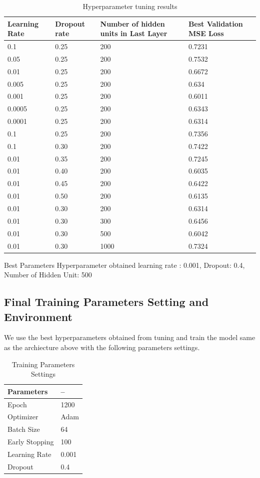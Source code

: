 \documentclass{article}
\begin{document}
\pagebreak

\begin{table}[htb]
	\caption{Hyperparameter tuning results}
	\label{sample-table}
	\centering
	\begin{tabular}{llll}
		\toprule
		\cmidrule{1-4}
		Learning Rate & Dropout rate & Number of hidden units in Last Layer & Best Validation MSE Loss\\
		\midrule
		0.1 & 0.25  & 200 & 0.7231  \\
		0.05 & 0.25  & 200 & 0.7532 \\
		0.01 & 0.25  & 200 & 0.6672\\
		0.005 & 0.25  & 200 & 0.634 \\
		0.001 & 0.25  & 200 & 0.6011\\
		0.0005 & 0.25  & 200 & 0.6343 \\
		0.0001 & 0.25  & 200 & 0.6314 \\
		0.1 & 0.25  & 200 & 0.7356\\
		0.1 & 0.30  & 200 & 0.7422 \\
		0.01 & 0.35  & 200 & 0.7245 \\
		0.01 & 0.40  & 200 & 0.6035 \\
		0.01 & 0.45  & 200 & 0.6422 \\
		0.01 & 0.50  & 200 & 0.6135 \\
		0.01 & 0.30  & 200 & 0.6314\\
		0.01 & 0.30  & 300 & 0.6456\\
		0.01 & 0.30  & 500 & 0.6042\\
		0.01 & 0.30  & 1000 & 0.7324\\
		\bottomrule
	\end{tabular}
\end{table}

Best Parameters Hyperparameter obtained { learning rate : 0.001, Dropout: 0.4, Number of Hidden Unit: 500}

 
\subsection{Final Training Parameters Setting and Environment}

We use the best hyperparameters obtained from tuning and train the model same as the archiecture above with the following parameters settings.

\begin{table}[htb]
	\caption{Training Parameters Settings}
	\label{sample-table}
	\centering
	\begin{tabular}{ll}
		\toprule
		\cmidrule{1-2}
		Parameters & -- \\
		\midrule
		Epoch & 1200 \\
		Optimizer & Adam \\
		Batch Size & 64 \\
		Early Stopping & 100 \\
		Learning Rate & 0.001 \\
		Dropout & 0.4 \\
		\midrule
	\end{tabular}
\end{table}
\end{document}
